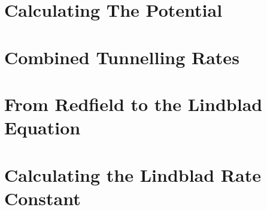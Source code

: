 \documentclass{article}
\begin{document}
\pagebreak
\printbibliography{}
\pagebreak
\begin{appendix}
    \section{Calculating The Potential}\label{app:interaction potential calculation}
    

    \section{Combined Tunnelling Rates}\label{app:combined tunnelling rates}
    

    \section{From Redfield to the Lindblad Equation}\label{app:redfield to Lindblad}
    

    \section{Calculating the Lindblad Rate Constant}\label{app:calculating gamma}
    
\end{appendix}
\end{document}
